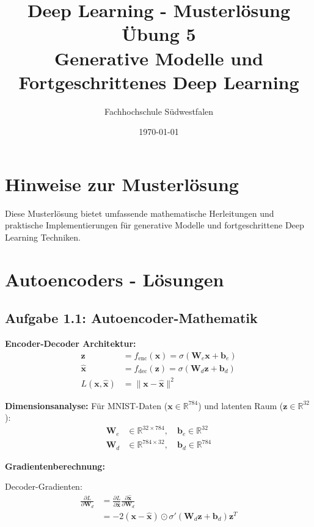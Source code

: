 ﻿\documentclass[12pt,a4paper]{article}
\title{\textbf{Deep Learning - Musterlösung Übung 5} \\ \large Generative Modelle und Fortgeschrittenes Deep Learning}
\author{Fachhochschule Südwestfalen}
\date{\today}
\begin{document}
\maketitle

\section*{Hinweise zur Musterlösung}
Diese Musterlösung bietet umfassende mathematische Herleitungen und praktische Implementierungen für generative Modelle und fortgeschrittene Deep Learning Techniken.

\section{Autoencoders - Lösungen}

\subsection{Aufgabe 1.1: Autoencoder-Mathematik}

\textbf{Encoder-Decoder Architektur:}
\begin{align}
\mathbf{z} &= f_{\text{enc}}(\mathbf{x}) = \sigma(\mathbf{W}_e \mathbf{x} + \mathbf{b}_e) \\
\hat{\mathbf{x}} &= f_{\text{dec}}(\mathbf{z}) = \sigma(\mathbf{W}_d \mathbf{z} + \mathbf{b}_d) \\
L(\mathbf{x}, \hat{\mathbf{x}}) &= \|\mathbf{x} - \hat{\mathbf{x}}\|^2
\end{align}

\textbf{Dimensionsanalyse:}
Für MNIST-Daten ($\mathbf{x} \in \mathbb{R}^{784}$) und latenten Raum ($\mathbf{z} \in \mathbb{R}^{32}$):
\begin{align}
\mathbf{W}_e &\in \mathbb{R}^{32 \times 784}, \quad \mathbf{b}_e \in \mathbb{R}^{32} \\
\mathbf{W}_d &\in \mathbb{R}^{784 \times 32}, \quad \mathbf{b}_d \in \mathbb{R}^{784}
\end{align}

\textbf{Gradientenberechnung:}

Decoder-Gradienten:
\begin{align}
\frac{\partial L}{\partial \mathbf{W}_d} &= \frac{\partial L}{\partial \hat{\mathbf{x}}} \frac{\partial \hat{\mathbf{x}}}{\partial \mathbf{W}_d} \\
&= -2(\mathbf{x} - \hat{\mathbf{x}}) \odot \sigma'(\mathbf{W}_d \mathbf{z} + \mathbf{b}_d) \mathbf{z}^T
\end{align}
\end{document}
